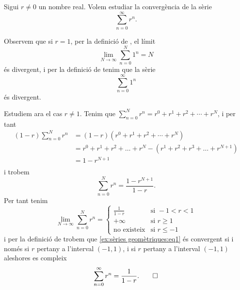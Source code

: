 \documentclass[../../Main.tex]{subfiles}
\begin{document}
	\begin{example}
		\label{ex:sèries geomètriques}
		Sigui \(r\neq0\) un nombre real. Volem estudiar la convergència de la sèrie
		\begin{equation}
			\label{ex:sèries geomètriques:eq1}
			\sum_{n=0}^{\infty}r^{n}.
		\end{equation}
		\begin{solution}
			Observem que si \(r=1\), per la definició de , el límit
			\[\lim_{N\to\infty}\sum_{n=0}^{N}1^{n}=N\]
			és divergent, i per la definició de  tenim que la sèrie
			\[\sum_{n=0}^{\infty}1^{n}\]
			és divergent.
			
			Estudiem ara el cas \(r\neq1\). Tenim que \(\sum_{n=0}^{N}r^{n}=r^{0}+r^{1}+r^{2}+\cdots+r^{N}\), i per tant
			\begin{align*}
				(1-r)\sum_{n=0}^{N}r^{n}&=(1-r)(r^{0}+r^{1}+r^{2}+\cdots+r^{N})\\
				&=r^{0}+r^{1}+r^{2}+\dots+r^{N}-(r^{1}+r^{2}+r^{3}+\dots+r^{N+1})\\
				&=1-r^{N+1}\\
			\end{align*}
			i trobem
			\begin{equation*}
				\sum_{n=0}^{N}r^{n}=\frac{1-r^{N+1}}{1-r}.
			\end{equation*}
			Per tant tenim
			\[\lim_{N\to\infty}\sum_{n=0}^{N}r^{n}=
			\begin{cases}
				\displaystyle \frac{1}{1-r} & \text{si }-1<r<1 \\
				+\infty & \text{si }r\geq1 \\
				\text{no existeix} & \text{si }r\leq-1 
			\end{cases}\]
			i per la definició de  trobem que \eqref{ex:sèries geomètriques:eq1} és convergent si i només si \(r\) pertany a l'interval \((-1,1)\), i si \(r\) pertany a l'interval \((-1,1)\) aleshores es compleix
			\begin{equation*}
				\sum_{n=0}^{\infty}r^{n}=\frac{1}{1-r}.\qedhere
			\end{equation*}
		\end{solution}
	\end{example}
\end{document}
